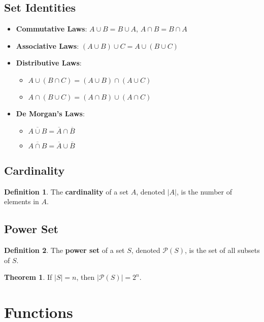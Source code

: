\documentclass[11pt]{article}
\theoremstyle{definition}
\newtheorem{definition}{Definition}[section]
\newtheorem{theorem}{Theorem}[section]
\begin{document}
\subsection{Set Identities}
\begin{itemize}
    \item \textbf{Commutative Laws}: $A \cup B = B \cup A$, $A \cap B = B \cap A$
    \item \textbf{Associative Laws}: $(A \cup B) \cup C = A \cup (B \cup C)$
    \item \textbf{Distributive Laws}: 
        \begin{itemize}
            \item $A \cup (B \cap C) = (A \cup B) \cap (A \cup C)$
            \item $A \cap (B \cup C) = (A \cap B) \cup (A \cap C)$
        \end{itemize}
    \item \textbf{De Morgan's Laws}: 
        \begin{itemize}
            \item $\overline{A \cup B} = \overline{A} \cap \overline{B}$
            \item $\overline{A \cap B} = \overline{A} \cup \overline{B}$
        \end{itemize}
\end{itemize}

\subsection{Cardinality}
\begin{definition}
The \textbf{cardinality} of a set $A$, denoted $|A|$, is the number of elements in $A$.
\end{definition}

\subsection{Power Set}
\begin{definition}
The \textbf{power set} of a set $S$, denoted $\mathcal{P}(S)$, is the set of all subsets of $S$.
\end{definition}

\begin{theorem}
If $|S| = n$, then $|\mathcal{P}(S)| = 2^n$.
\end{theorem}

\section{Functions}
\end{document}
